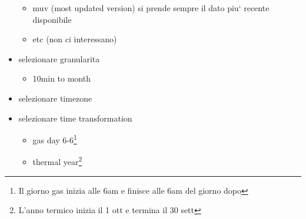 \begin{itemize}
\begin{itemize}
                \item muv (most updated version) si prende sempre il dato piu` recente disponibile
                \item etc (non ci interessano)
            \end{itemize}
        \item selezionare granularita
            \begin{itemize}
                \item 10min to month
            \end{itemize}
        \item selezionare timezone
        \item selezionare time transformation
            \begin{itemize}
                \item gas day 6-6\footnote{Il giorno gas inizia alle 6am e finisce alle 6am del giorno dopo}
                \item thermal year\footnote{L'anno termico inizia il 1 ott e termina il 30 sett}
            \end{itemize}
    \end{itemize}
